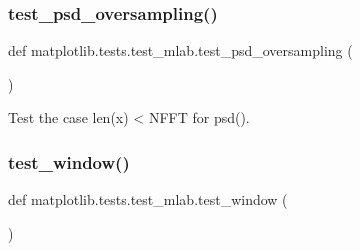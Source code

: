 \subsubsection{\texorpdfstring{test\+\_\+psd\+\_\+oversampling()}{test\_psd\_oversampling()}}
{\footnotesize\ttfamily def matplotlib.\+tests.\+test\+\_\+mlab.\+test\+\_\+psd\+\_\+oversampling (\begin{DoxyParamCaption}{ }\end{DoxyParamCaption})}

\begin{DoxyVerb}Test the case len(x) < NFFT for psd().\end{DoxyVerb}
 \mbox{\label{namespacematplotlib_1_1tests_1_1test__mlab_af61e35ef247cd3468a13aad94592d6be}} 
\subsubsection{\texorpdfstring{test\+\_\+window()}{test\_window()}}
{\footnotesize\ttfamily def matplotlib.\+tests.\+test\+\_\+mlab.\+test\+\_\+window (\begin{DoxyParamCaption}{ }\end{DoxyParamCaption})}

